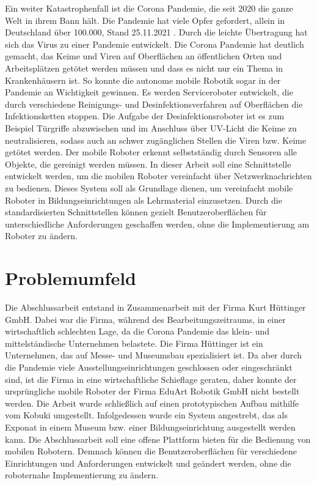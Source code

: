 Ein weiter Katastrophenfall ist die Corona Pandemie, die seit 2020 die ganze Welt in ihrem Bann hält. Die Pandemie hat viele Opfer gefordert, allein in Deutschland über 100.000, Stand 25.11.2021 \cite{tagesschau.25.11.2021}. Durch die leichte Übertragung hat sich das Virus zu einer Pandemie entwickelt. Die Corona Pandemie hat deutlich gemacht, das Keime und Viren auf Oberflächen an öffentlichen Orten und Arbeitsplätzen getötet werden müssen und dass es nicht nur ein Thema in Krankenhäusern ist. \cite{VDI_Corona_Roboter.2021} So konnte die autonome mobile Robotik sogar in der Pandemie an Wichtigkeit gewinnen. Es werden Serviceroboter entwickelt, die durch verschiedene Reinigungs- und Desinfektionsverfahren auf Oberflächen die Infektionsketten stoppen. Die Aufgabe der Desinfektionsroboter ist es zum Beispiel Türgriffe abzuwischen und im Anschluss über UV-Licht die Keime zu neutralisieren, sodass auch an schwer zugänglichen Stellen die Viren bzw. Keime getötet werden. Der mobile Roboter erkennt selbstständig durch Sensoren alle Objekte, die gereinigt werden müssen. \cite{VDI_Corona_Roboter.2021}
\newline
In dieser Arbeit soll eine Schnittstelle entwickelt werden, um die mobilen Roboter vereinfacht über Netzwerknachrichten zu bedienen. Dieses System soll als Grundlage dienen, um vereinfacht mobile Roboter in Bildungseinrichtungen als Lehrmaterial einzusetzen. Durch die standardisierten Schnittstellen können gezielt Benutzeroberflächen für unterschiedliche Anforderungen geschaffen werden, ohne die Implementierung am Roboter zu ändern.  


\section{Problemumfeld}
Die Abschlussarbeit entstand in Zusammenarbeit mit der Firma Kurt Hüttinger GmbH. Dabei war die Firma, während des Bearbeitungszeitraums, in einer wirtschaftlich schlechten Lage, da die Corona Pandemie das klein- und mittelständische Unternehmen belastete. Die Firma Hüttinger ist ein Unternehmen, das auf Messe- und Museumsbau spezialisiert ist. Da aber durch die Pandemie viele Ausstellungseinrichtungen geschlossen oder eingeschränkt sind, ist die Firma in eine wirtschaftliche Schieflage geraten, daher konnte der ursprüngliche mobile Roboter der Firma EduArt Robotik GmbH nicht bestellt werden. Die Arbeit wurde schließlich auf einen prototypischen Aufbau mithilfe vom Kobuki umgestellt. Infolgedessen wurde ein System angestrebt, das als Exponat in einem Museum bzw. einer Bildungseinrichtung ausgestellt werden kann. Die Abschlussarbeit soll eine offene Plattform bieten für die Bedienung von mobilen Robotern. Demnach können die Benutzeroberflächen für verschiedene Einrichtungen und Anforderungen entwickelt und geändert werden, ohne die roboternahe Implementierung zu ändern.  



